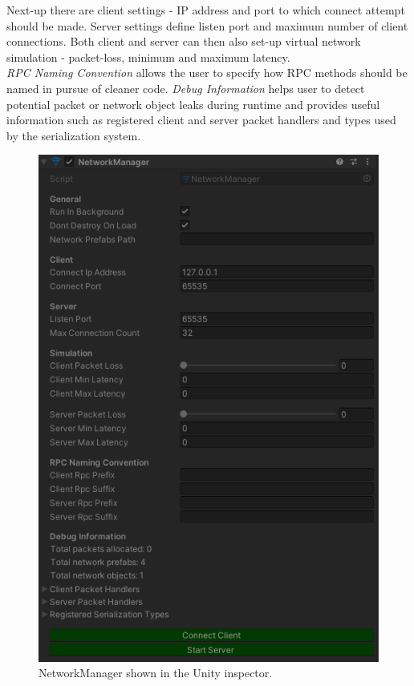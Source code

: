 \documentclass[times, utf8, diplomski]{fer}
\begin{document}
Next-up there are client settings - IP address and port to which connect attempt should be made. Server settings define listen port and maximum number of client connections. Both client and server can then also set-up virtual network simulation - packet-loss, minimum and maximum latency.\\

\textit{RPC Naming Convention} allows the user to specify how RPC methods should be named in pursue of cleaner code. \textit{Debug Information} helps user to detect potential packet or network object leaks during runtime and provides useful information such as registered client and server packet handlers and types used by the serialization system.

\begin{figure}[H]
	\centering
	\includegraphics[scale=0.85]{NetworkManager-inspector}
	\caption{NetworkManager shown in the Unity inspector.}
\end{figure}
\end{document}
